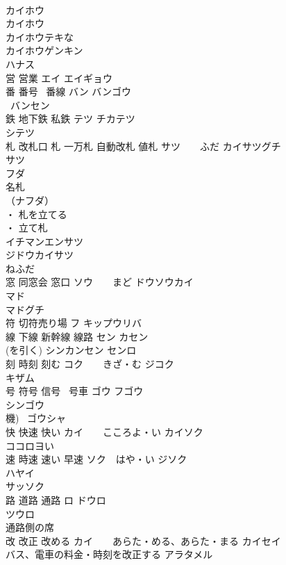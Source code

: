 \documentclass[8pt]{extreport}
\begin{document}
\begin{CJK}{UTF8}{min}
\\	カイホウ 
\\	カイホウ 
\\	カイホウテキな 
\\	カイホウゲンキン 
\\	ハナス
\\	営 営業	エイ エイギョウ 
\\	番 番号 ~番線	バン バンゴウ 
\\	~バンセン 
\\	鉄 地下鉄 私鉄	テツ チカテツ 
\\	シテツ 
\\	札 改札口 札 一万札 自動改札 値札	サツ　　ふだ カイサツグチ 
\\	サツ 
\\	フダ 
\\	名札
\\	（ナフダ）
\\	・ 札を立てる 
\\	・ 立て札 
\\	イチマンエンサツ 
\\	ジドウカイサツ
\\	ねふだ 
\\	窓 同窓会 窓口	ソウ　　まど ドウソウカイ　
\\	マド 
\\	マドグチ 
\\	符 切符売り場	フ キップウリバ　
\\	線 下線 新幹線 線路	セン カセン 
\\	(を引く) シンカンセン センロ 
\\	刻 時刻 刻む	コク　　きざ・む ジコク 
\\	キザム 
\\	号 符号 信号 ~号車	ゴウ フゴウ 
\\	シンゴウ 
\\	機) ~ゴウシャ 
\\	快 快速 快い	カイ　　こころよ・い カイソク　
\\	ココロヨい 
\\	速 時速 速い 早速	ソク　はや・い ジソク　
\\	ハヤイ 
\\	サッソク 
\\	路 道路 通路	ロ ドウロ 
\\	ツウロ 
\\	通路側の席 
\\	改 改正 改める	カイ　　あらた・める、あらた・まる カイセイ 
\\	バス、電車の料金・時刻を改正する アラタメル 

\end{CJK}
\end{document}
